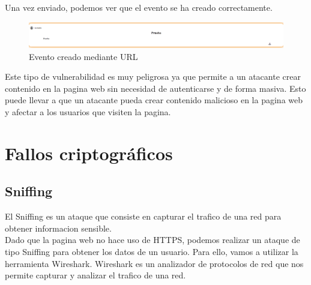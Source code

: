 \documentclass{report}
\begin{document}
                Una vez enviado, podemos ver que el evento se ha creado correctamente.
                \begin{figure}[H]
                    \centering
                    \includegraphics[width=1\textwidth]{./img/vulnerabilidades/2.1/1.1.png}
                    \caption{Evento creado mediante URL}
                \end{figure}

                Este tipo de vulnerabilidad es muy peligrosa ya que permite a un atacante crear contenido en la pagina web sin necesidad de autenticarse y de forma masiva.
                Esto puede llevar a que un atacante pueda crear contenido malicioso en la pagina web y afectar a los usuarios que visiten la pagina.               
            \clearpage
        \section{Fallos criptográficos}
            \subsection{Sniffing}
                El Sniffing es un ataque que consiste en capturar el trafico de una red para obtener informacion sensible.\\
                Dado que la pagina web no hace uso de HTTPS, podemos realizar un ataque de tipo Sniffing para obtener los datos de un usuario.
                Para ello, vamos a utilizar la herramienta Wireshark.
                Wireshark es un analizador de protocolos de red que nos permite capturar y analizar el trafico de una red.\\
\end{document}
